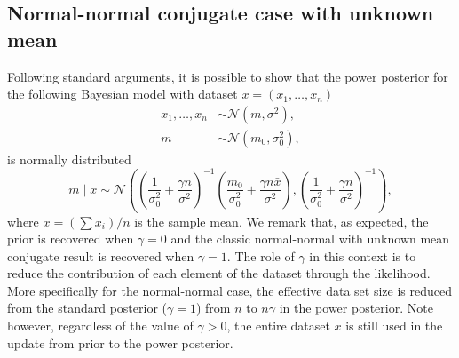 \documentclass{article}
\begin{document}
\subsection{Normal-normal conjugate case with unknown mean}
Following standard arguments, it is possible to show that the power posterior for the following Bayesian model with dataset $x = (x_1, \ldots, x_n)$
\begin{subequations}
\begin{align}
x_1, \ldots, x_n &\sim \mathcal{N}(m, \sigma^2), \\
m &\sim \mathcal{N}(m_0, \sigma_0^2),
\end{align}
\end{subequations}
is normally distributed
\begin{equation}
m \;|\; x \sim \mathcal{N} \left( \left( \frac{1}{\sigma_0^2} + \frac{\gamma n}{\sigma^2} \right)^{-1} \left(\frac{m_0}{\sigma_0^2} + \frac{\gamma n \bar{x}}{\sigma^2}  \right), \left( \frac{1}{\sigma_0^2} + \frac{\gamma n}{\sigma^2} \right)^{-1} \right),
\end{equation}
where $\bar{x} = (\sum x_i)/ n$ is the sample mean. We remark that, as expected, the prior is recovered when $\gamma = 0$ and the classic normal-normal with unknown mean conjugate result is recovered when $\gamma = 1$. The role of $\gamma$ in this context is to reduce the contribution of each element of the dataset through the likelihood. More specifically for the normal-normal case, the effective data set size is reduced from the standard posterior ($\gamma = 1$) from $n$ to $n \gamma$ in the power posterior. Note however, regardless of the value of $\gamma > 0$, the entire dataset $x$ is still used in the update from prior to the power posterior.
\end{document}

